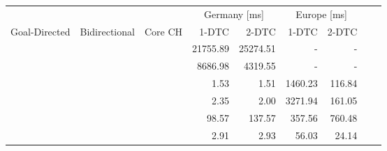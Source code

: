 \begin{tabular}{cccrrrrrr}
	\toprule
	              &               &         & \multicolumn{2}{c}{Germany [\si{\milli\second}]} & \multicolumn{2}{c}{Europe [\si{\milli\second}]}                 \\
	Goal-Directed & Bidirectional & Core CH & 1-DTC                                            & 2-DTC                                           & 1-DTC & 2-DTC \\
	\midrule
	\xmark        & \xmark        & \xmark  & 21755.89                                                & 25274.51                                               & -     & -     \\
	\xmark        & \cmark        & \xmark  & 8686.98                                                & 4319.55                                               & -     & -     \\
	\cmark        & \xmark        & \xmark  & 1.53                                                & 1.51                                               & 1460.23     & 116.84     \\
	\cmark        & \cmark        & \xmark  & 2.35                                                & 2.00                                               & 3271.94     & 161.05     \\
	\xmark        & \cmark        & \cmark  & 98.57                                                & 137.57                                               & 357.56     & 760.48     \\
	\cmark        & \cmark        & \cmark  & 2.91                                                & 2.93                                               & 56.03     & 24.14     \\
	\bottomrule
\end{tabular}